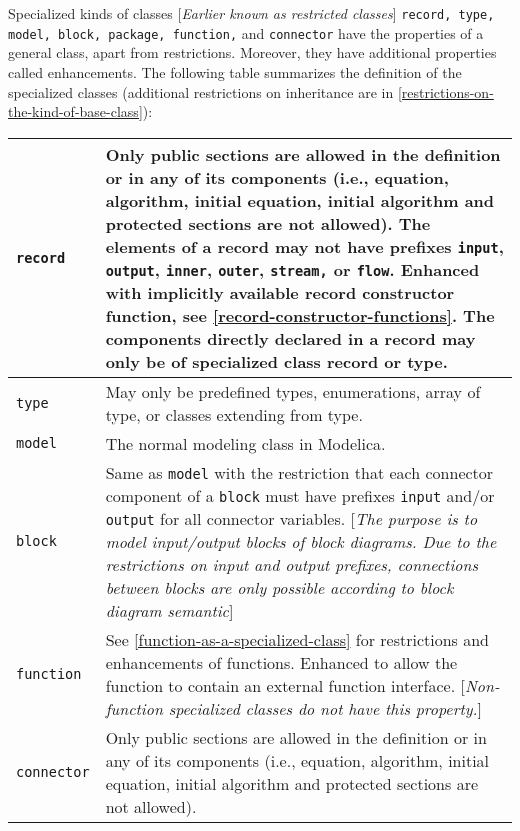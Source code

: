 Specialized kinds of classes {[}\emph{Earlier known as restricted
classes}{]} \lstinline!record, type, model, block, package, function,! and \lstinline!connector!
have the properties of a general class, apart from restrictions.
Moreover, they have additional properties called enhancements. The
following table summarizes the definition of the specialized classes
(additional restrictions on inheritance are in \autoref{restrictions-on-the-kind-of-base-class}):

\begin{longtable}{|p{4cm}|p{9cm}|}
\hline \endhead
\lstinline!record! & Only public sections are allowed in the definition or
in any of its components (i.e., equation, algorithm, initial equation,
initial algorithm and protected sections are not allowed). The elements
of a record may not have prefixes \lstinline!input!, \lstinline!output!,
\lstinline!inner!, \lstinline!outer!, \lstinline!stream,!
or \lstinline!flow!. Enhanced with implicitly available record constructor function,
see \autoref{record-constructor-functions}. The components
directly declared in a record may only be of specialized class record
or type.\\ \hline
\lstinline!type! & May only be predefined types, enumerations, array of
type, or classes extending from type.\\ \hline
\lstinline!model! & The normal modeling class in Modelica.\\ \hline
\lstinline!block! & Same as \lstinline!model! with the restriction that each connector
component of a \lstinline!block! must have prefixes \lstinline!input! and/or \lstinline!output! for all
connector variables. {[}\emph{The purpose is to model input/output
blocks of block diagrams. Due to the restrictions on input and output
prefixes, connections between blocks are only possible according to
block diagram semantic}{]}\\ \hline
\lstinline!function! & See \autoref{function-as-a-specialized-class} for restrictions
and enhancements of functions. Enhanced to allow the
function to contain an external function interface.
{[}\emph{Non-function specialized classes do not have this
property.}{]}\\ \hline
\lstinline!connector! & Only public sections are allowed in the definition or in any of its
components (i.e., equation, algorithm, initial equation, initial
algorithm and protected sections are not allowed).


\end{longtable}
